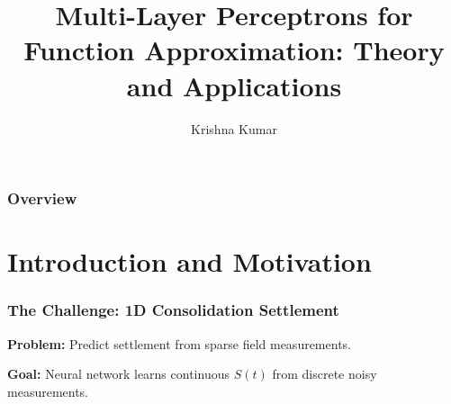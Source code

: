 \documentclass[notes]{beamer}
\title[MLP]{Multi-Layer Perceptrons for Function Approximation: Theory and Applications}
\author{Krishna Kumar} %
\institute[UT Austin] %
{
University of Texas at Austin \\
\medskip
\textit{
  \url{krishnak@utexas.edu}} %
}
\date{} %
\begin{document}
\begin{frame}
\titlepage %
\end{frame}

\begin{frame}
 \frametitle{Overview}
 \tableofcontents
\end{frame}


\section{Introduction and Motivation}

\begin{frame}
\frametitle{The Challenge: 1D Consolidation Settlement}

\textbf{Problem:} Predict settlement from sparse field measurements.


\textbf{Goal:} Neural network learns continuous $S(t)$ from discrete noisy measurements.

\end{frame}
\end{document}
